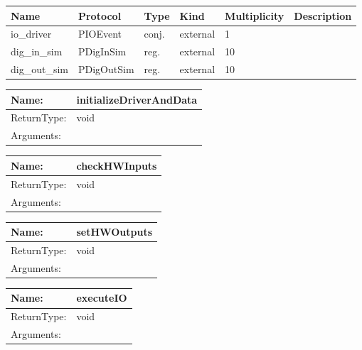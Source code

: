 

\begin{tabular}[ht]{|l|l|l|l|l|p{5cm}|}
\hline
\textbf{Name} & \textbf{Protocol} & \textbf{Type} & \textbf{Kind} & \textbf{Multiplicity} & \textbf{Description}\\
\hline
io\_driver & PIOEvent & conj. & external & 1 & \\
\hline
dig\_in\_sim & PDigInSim & reg. & external & 10 & \\
\hline
dig\_out\_sim & PDigOutSim & reg. & external & 10 & \\
\hline
\end{tabular}


\begin{par}

\end{par}



\begin{tabular}[ht]{|l|l|}
\hline		
	Name: & initializeDriverAndData\\
	\hline
	ReturnType: &  void\\
	\hline
	Arguments: & \\
	\hline
\end{tabular}
\newline\newline\newline
\begin{tabular}[ht]{|l|l|}
\hline		
	Name: & checkHWInputs\\
	\hline
	ReturnType: &  void\\
	\hline
	Arguments: & \\
	\hline
\end{tabular}
\newline\newline\newline
\begin{tabular}[ht]{|l|l|}
\hline		
	Name: & setHWOutputs\\
	\hline
	ReturnType: &  void\\
	\hline
	Arguments: & \\
	\hline
\end{tabular}
\newline\newline\newline
\begin{tabular}[ht]{|l|l|}
\hline		
	Name: & executeIO\\
	\hline
	ReturnType: &  void\\
	\hline
	Arguments: & \\
	\hline
\end{tabular}
\newline\newline\newline
